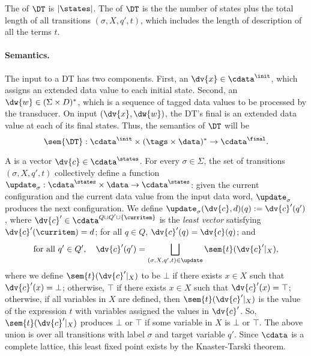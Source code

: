 The  of $\DT$ is $|\states|$.
The  of $\DT$ is the the number of states plus the total length of all transitions
$(\sigma, X, q', t)$, which includes the length of description of all the terms $t$.

\label{dt:subsec:dt-semantics}

\paragraph*{Semantics.}
The input to a DT has two components.
First, an  $\dv{x} \in \cdata^\init$, which assigns an extended data value to each initial state. Second, an  $\dw{w} \in (\Sigma \times D)^*$, which is a sequence of tagged data values to be processed by the transducer. On input $(\dv{x},\dw{w})$, the DT's final  is an extended data value at each of its final states.
Thus, the semantics of $\DT$ will be
\[
\sem{\DT} : \cdata^\init \times (\tags \times \data)^* \to \cdata^\final.
\]

A  is a vector $\dv{c} \in \cdata^\states$.
For every $\sigma \in \Sigma$, the set of transitions $(\sigma, X, q', t)$
collectively define a function $\update_\sigma : \cdata^\states \times \data \to \cdata^\states$:
given the current configuration and the current data value from the input data word,
$\update_\sigma$ produces the next configuration.
We define $\update_\sigma(\dv{c},d)(q) := \dv{c}'(q')$,
where $\dv{c}' \in \cdata^{Q \cup Q' \cup \{\curritem\}}$ is the \emph{least vector} satisfying
$\dv{c}'(\curritem) = d$; for all $q \in Q$, $\dv{c}'(q) = \dv{c}(q)$;
and
\begin{equation}
\text{for all }q' \in Q',\quad
\dv{c}'(q') = \bigsqcup_{(\sigma, X, q', t) \in \update} \sem{t}(\dv{c}'|_X),
\label{dt:eq:fixpoint-semantics}
\end{equation}
where we define $\sem{t}(\dv{c}'|_X)$ to be $\bot$ if there exists $x \in X$ such that $\dv{c}'(x) = \bot$; otherwise, $\top$ if there exists $x \in X$ such that $\dv{c}'(x) = \top$; otherwise, if all variables in $X$ are defined, then $\sem{t}(\dv{c}'|_X)$ is the value of the expression $t$ with variables assigned the values in $\dv{c}'$.
So, $\sem{t}(\dv{c}'|_X)$ produces $\bot$ or $\top$ if some variable in $X$ is $\bot$ or $\top$.
The above union is over all transitions with label $\sigma$ and target variable $q'$.
Since $\cdata$ is a complete lattice, this least fixed point exists by the Knaster-Tarski theorem.

